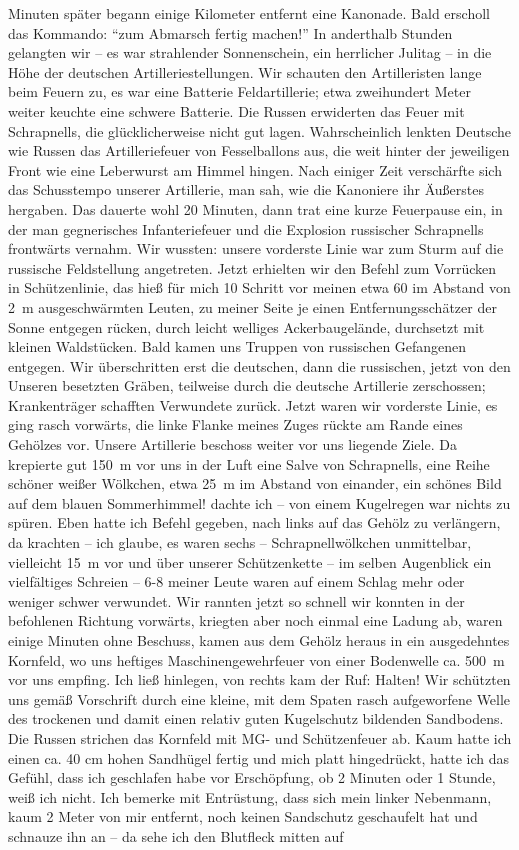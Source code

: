 \documentclass[a5paper,pagesize,10pt,twoside=true]{scrbook}
\begin{document}
Minuten später begann einige Kilometer entfernt eine Kanonade. Bald erscholl das Kommando: \enquote{zum Abmarsch fertig machen!} In anderthalb Stunden gelangten wir -- es war strahlender Sonnenschein, ein herrlicher Julitag -- in die Höhe der deutschen Artilleriestellungen. Wir schauten den Artilleristen lange beim Feuern zu, es war eine Batterie Feldartillerie; etwa zweihundert Meter weiter keuchte eine schwere Batterie. Die Russen erwiderten das Feuer mit Schrapnells, die glücklicherweise nicht gut lagen. Wahrscheinlich lenkten Deutsche wie Russen das Artilleriefeuer von Fesselballons aus, die weit hinter der jeweiligen Front wie eine Leberwurst am Himmel hingen. Nach einiger Zeit verschärfte sich das Schusstempo unserer Artillerie, man sah, wie die Kanoniere ihr Äußerstes hergaben. Das dauerte wohl 20 Minuten, dann trat eine kurze Feuerpause ein, in der man gegnerisches Infanteriefeuer und die Explosion russischer Schrapnells frontwärts vernahm. Wir wussten: unsere vorderste Linie war zum Sturm auf die russische Feldstellung angetreten. Jetzt erhielten wir den Befehl zum Vorrücken in Schützenlinie, das hieß für mich 10 Schritt vor meinen etwa 60 im Abstand von 2~m ausgeschwärmten Leuten, zu meiner Seite je einen Entfernungsschätzer der Sonne entgegen rücken, durch leicht welliges Ackerbaugelände, durchsetzt mit kleinen Waldstücken. Bald kamen uns Truppen von russischen Gefangenen entgegen. Wir überschritten erst die deutschen, dann die russischen, jetzt von den Unseren besetzten Gräben, teilweise durch die deutsche Artillerie zerschossen; Krankenträger schafften Verwundete zurück. Jetzt waren wir vorderste Linie, es ging rasch vorwärts, die linke Flanke meines Zuges rückte am Rande eines Gehölzes vor. Unsere Artillerie beschoss weiter vor uns liegende Ziele. Da krepierte gut 150~m vor uns in der Luft eine Salve von Schrapnells, eine Reihe schöner weißer Wölkchen, etwa 25~m im Abstand von einander, ein schönes Bild auf dem blauen Sommerhimmel! dachte ich -- von einem Kugelregen war nichts zu spüren. Eben hatte ich Befehl gegeben, nach links auf das Gehölz zu verlängern, da krachten -- ich glaube, es waren sechs -- Schrapnellwölkchen unmittelbar, vielleicht 15~m vor und über unserer Schützenkette -- im selben Augenblick ein vielfältiges Schreien -- 6-8 meiner Leute waren auf einem Schlag mehr oder weniger schwer verwundet. Wir rannten jetzt so schnell wir konnten in der befohlenen Richtung vorwärts, kriegten aber noch einmal eine Ladung ab, waren einige Minuten ohne Beschuss, kamen aus dem Gehölz heraus in ein ausgedehntes Kornfeld, wo uns heftiges Maschinengewehrfeuer von einer Bodenwelle ca. 500~m vor uns empfing. Ich ließ hinlegen, von rechts kam der Ruf: Halten! Wir schützten uns gemäß Vorschrift durch eine kleine, mit dem Spaten rasch aufgeworfene Welle des trockenen und damit einen relativ guten Kugelschutz bildenden Sandbodens. Die Russen strichen das Kornfeld mit MG- und Schützenfeuer ab. Kaum hatte ich einen ca. 40 cm hohen Sandhügel fertig und mich platt hingedrückt, hatte ich das Gefühl, dass ich geschlafen habe vor Erschöpfung, ob 2 Minuten oder 1 Stunde, weiß ich nicht. Ich bemerke mit Entrüstung, dass sich mein linker Nebenmann, kaum 2 Meter von mir entfernt, noch keinen Sandschutz geschaufelt hat und schnauze ihn an -- da sehe ich den Blutfleck mitten auf 
\end{document}
